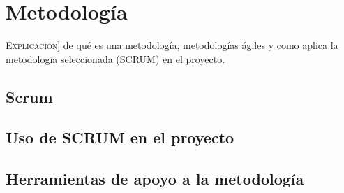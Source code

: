
\chapter{Metodología}
\label{chap:metodologia}

\lettrine{E}{xplicación}] de qué es una metodología, metodologías ágiles y como aplica la metodología seleccionada (SCRUM) en el proyecto.


\section{Scrum}


\section{Uso de SCRUM en el proyecto}

\section{Herramientas de apoyo a la metodología}
